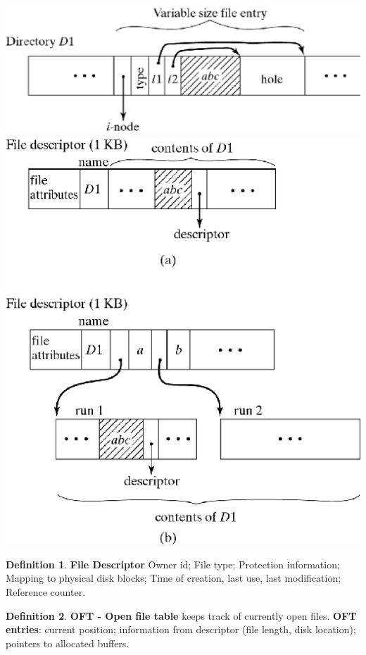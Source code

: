\documentclass[11pt,a4paper]{article}
\theoremstyle{definition}
\newtheorem{definition}{Definition}[section]
\begin{document}
	\begin{minipage}{0.5\linewidth}
		\includegraphics[width=0.8\linewidth ]{m2/implementDirectory}
		\includegraphics[width=0.8\linewidth ]{m2/entryOrganization}
	\end{minipage}
	
\begin{definition}{\textbf{File Descriptor}}
	Owner id; File type; Protection information; Mapping to physical disk blocks; Time of creation, last use, last modification; Reference counter.
\end{definition}

\begin{definition}{\textbf{OFT - Open file table}}
	keeps track of currently open files. \textbf{OFT entries}: current position; information from descriptor (file length, disk location); pointers to allocated buffers.
\end{definition}
\end{document}

